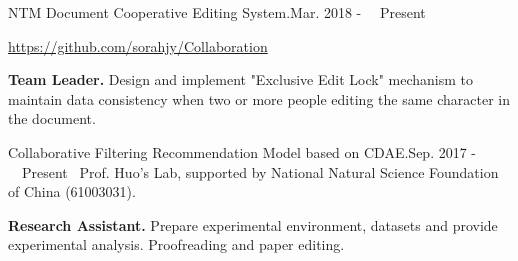 \documentclass{sorahjy_cv}
\begin{document}
\begin{sectionContentSimple}{NTM Document Cooperative Editing System.}{Mar. 2018 - \ \ Present \ }
	\item \url{https://github.com/sorahjy/Collaboration}
	\item \textbf{Team Leader.} Design and implement "Exclusive Edit Lock" mechanism to maintain data consistency when two or more people editing the same character in the document.
\end{sectionContentSimple}


\begin{sectionContentNormal}{Collaborative Filtering Recommendation Model based on CDAE.}{Sep. 2017 - \ \ Present \ }{Prof. Huo's Lab, supported by National Natural Science Foundation of China (61003031).}
	\item \textbf{Research Assistant.} Prepare experimental environment, datasets and provide experimental analysis. Proofreading and paper editing.
\end{sectionContentNormal}

%
%









\end{document}
